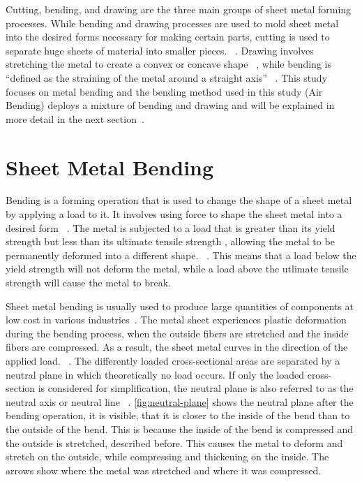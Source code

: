 Cutting, bending, and drawing are the three main groups of sheet metal forming processes.
While bending and drawing processes are used to mold sheet metal into the desired forms necessary for making certain
parts, cutting is used to separate huge sheets of material into smaller pieces.
~\cite[p. 405]{groover_fundamentalsmodernmanufacturing_2020}.
Drawing involves stretching the metal to create a convex or concave shape
~\cite[p. 416]{groover_fundamentalsmodernmanufacturing_2020}, while bending is ``defined as the straining of the
metal around a straight axis''
~\cite[p. 412]{groover_fundamentalsmodernmanufacturing_2020}.
This study focuses on metal bending and the bending method used in this study (Air Bending) deploys a mixture of
bending and drawing and will be explained in more detail in the next
section~\cite[pp. 416]{groover_fundamentalsmodernmanufacturing_2020}.


\section{Sheet Metal Bending}\label{sec:bending}
Bending is a forming operation that is used to change the shape of a sheet metal by
applying a load to it.
It involves using force to shape the sheet metal into a desired form
~\cite[p. 1]{dib_singleensembleclassifiers_2020}.
The metal is subjected to a load that is greater than its yield strength but less than its ultimate tensile strength
, allowing the metal to be permanently deformed into a different shape.
~\cite[p. 1]{baig_machinelearningprediction_2021}.
This means that a load below the yield strength will not deform the metal, while a load above the utlimate tensile
strength will cause the metal to break.

Sheet metal bending is usually used to produce large quantities of components at low cost in various
industries~\cite[p. 1]{dib_singleensembleclassifiers_2020}.
The metal sheet experiences plastic deformation during the bending process, when the outside fibers are stretched and
the inside fibers are compressed.
As a result, the sheet metal curves in the direction of the applied load.
~\cite[pp. 1--3]{baig_machinelearningprediction_2021}.
The differently loaded cross-sectional areas are separated by a neutral plane in which theoretically no load occurs.
If only the loaded cross-section is considered for simplification, the neutral plane is also referred to as the
neutral axis or neutral line
~\cite[pp. 67]{gustafson1998analytical}.
\cref{fig:neutral-plane} shows the neutral plane after the bending operation, it is
visible, that it is closer to the inside of the bend than to the outside of the bend.
This is because the inside of the bend is compressed and the outside is stretched, described before.
This causes the metal to deform and stretch on the outside, while compressing and thickening on the inside.
The arrows show where the metal was stretched and where it was compressed.

